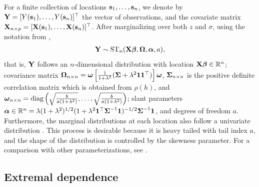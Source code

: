For a finite collection of locations $\mathbf{s}_1, \ldots, \mathbf{s}_n$, we denote by $\mathbf{Y} = [Y(\mathbf{s}_1), \ldots, Y(\mathbf{s}_n)]^\top$ the vector of observations, and the covariate matrix $\mathbf{X}_{n \times p} = [\mathbf{X}(\mathbf{s}_1), \ldots, \mathbf{X}(\mathbf{s}_n)]^\top$.
After marginalizing over both $z$ and $\sigma$, using the notation from \citet[p. 176]{Azzalini2014},
\begin{align} \label{steq:stazzalini}
  \mathbf{Y} \sim \text{ST}_n(\mathbf{X} \mbox{\boldmath $\beta$}, \mbox{\boldmath $\Omega$}, \mbox{\boldmath $\alpha$}, a),
\end{align}
that is, $\mathbf{Y}$ follows an $n$-dimensional \skewt{} distribution with location $\mathbf{X} \mbox{\boldmath $\beta$} \in \mathbb{R}^n$; covariance matrix $\mbox{\boldmath $\Omega$}_{n \times n} = \mbox{\boldmath $\omega$} \left[ \frac{1}{1 + \lambda^2}(\mbox{\boldmath $\Sigma$} + \lambda^2 \mathbf{1} \mathbf{1}^\top) \right] \mbox{\boldmath $\omega$}$, $\mbox{\boldmath $\Sigma$}_{n \times n}$ is the positive definite correlation matrix which is obtained from $\rho(h)$, and $\mbox{\boldmath $\omega$}_{n \times n} = \text{diag}\left(\sqrt{\frac{ b }{a(1 + \lambda^2)}}, \ldots, \sqrt{\frac{ b }{a(1 + \lambda^2)}} \right)$; slant parameters $\mbox{\boldmath $\alpha$} \in \mathbb{R}^n = \lambda (1 + \lambda^2)^{1 / 2} (1 + \lambda^2 \mathbf{1}^\top \mbox{\boldmath $\Sigma$}^{-1} \mathbf{1})^{-1/2} \mbox{\boldmath $\Sigma$}^{-1} \mathbf{1}$, and degrees of freedom $a$.
Furthermore, the marginal distributions at each location also follow a univariate \skewt{} distribution \citep{Azzalini2014}.
This process is desirable because it is heavy tailed with tail index $a$, and the shape of the distribution is controlled by the skewness parameter.
For a comparison with other parameterizations, see .


\subsection{Extremal dependence}\label{sts:extdep}

